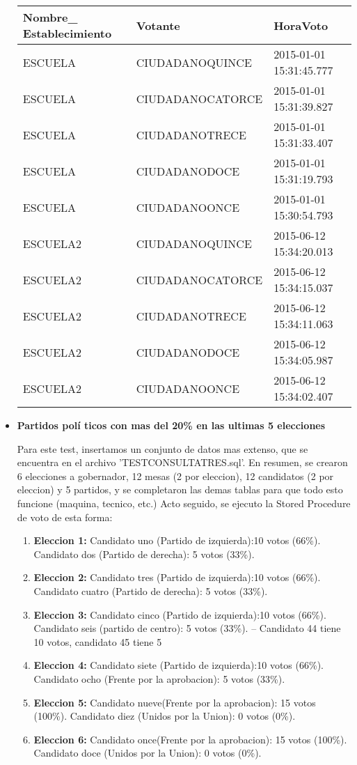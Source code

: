 \begin{itemize}
 \begin{tabular}{| l| l| l|}
	\hline 
	    Nombre\_ Establecimiento & Votante & HoraVoto \\
	  \hline 
	   ESCUELA &CIUDADANOQUINCE & 2015-01-01 15:31:45.777 \\
	   \hline 
	   ESCUELA &CIUDADANOCATORCE & 2015-01-01 15:31:39.827 \\
	   \hline 
	   ESCUELA &CIUDADANOTRECE & 2015-01-01 15:31:33.407 \\
	   \hline 
	  ESCUELA  & CIUDADANODOCE & 2015-01-01 15:31:19.793\\
	   \hline 
	   ESCUELA  & CIUDADANOONCE & 2015-01-01 15:30:54.793\\
	   \hline 
	   ESCUELA2 &CIUDADANOQUINCE & 2015-06-12 15:34:20.013 \\
	   \hline 
	   ESCUELA2 &CIUDADANOCATORCE & 2015-06-12 15:34:15.037 \\
	   \hline 
	   ESCUELA2  & CIUDADANOTRECE &2015-06-12 15:34:11.063 \\
	   \hline 
	   ESCUELA2  & CIUDADANODOCE &2015-06-12 15:34:05.987 \\
	   \hline 
	   ESCUELA2  & CIUDADANOONCE &2015-06-12 15:34:02.407 \\
	   \hline 
	\end{tabular}

\item \textbf{Partidos pol\'i ticos con mas del 20\% en las ultimas 5 elecciones}

Para este test, insertamos un conjunto de datos mas extenso, que se encuentra en el archivo 'TESTCONSULTATRES.sql'. En resumen, se crearon 6 elecciones a gobernador, 12 mesas (2 por eleccion), 12 candidatos (2 por eleccion) y 5 partidos, y se completaron las demas tablas para que todo esto funcione (maquina, tecnico, etc.) Acto seguido, se ejecuto la Stored Procedure de voto de esta forma:

\begin{enumerate}
	\item \textbf{Eleccion 1:} Candidato uno (Partido de izquierda):10 votos (66\%). Candidato dos (Partido de derecha): 5 votos (33\%). 
	\item \textbf{Eleccion 2:} Candidato tres (Partido de izquierda):10 votos (66\%). Candidato cuatro (Partido de derecha): 5 votos (33\%).
	\item \textbf{Eleccion 3:} Candidato cinco (Partido de izquierda):10 votos (66\%). Candidato seis (partido de centro): 5 votos (33\%).
-- Candidato 44 tiene 10 votos, candidato 45 tiene 5
	\item \textbf{Eleccion 4:} Candidato siete (Partido de izquierda):10 votos (66\%). Candidato ocho (Frente por la aprobacion): 5 votos (33\%).
	\item \textbf{Eleccion 5:} Candidato nueve(Frente por la aprobacion): 15 votos (100\%). Candidato diez (Unidos por la Union): 0 votos (0\%).
	\item \textbf{Eleccion 6:} Candidato once(Frente por la aprobacion): 15 votos (100\%). Candidato doce (Unidos por la Union): 0 votos (0\%).


\end{enumerate}
\end{itemize}
